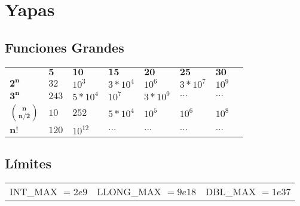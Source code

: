 \documentclass{article}
\begin{document}
\tableofcontents


\pagebreak


\pagebreak


\section{Yapas}

\subsection*{Funciones Grandes}

\begin{tabularx}{0.33\textwidth}{YYYYYYYY}
                      & $\mathbf{5}$ & $\mathbf{10}$ & $\mathbf{15}$ & $\mathbf{20}$ & $\mathbf{25}$ & $\mathbf{30}$ \\
     $\mathbf{2^n}$            & $32$  & $10^3$    & $3*10^4$ & $10^6$   & $3*10^7$ & $10^9$ \\
     $\mathbf{3^n}$            & $243$ & $5*10^4$  & $10^7$   & $3*10^9$ & $...$    & $...$ \\
     $\mathbf{\binom{n}{n/2}}$ & $10$  & $252$     & $5*10^4$ & $10^5$   & $10^6$   & $10^8$ \\
     $\mathbf{n!}$             & $120$ & $10^{12}$ & $...$    & $...$    & $...$    & $...$
\end{tabularx}

\subsection*{Límites}
\begin{tabular}{ccc}
    INT\_MAX $= 2e9$ & LLONG\_MAX $= 9e18$ & DBL\_MAX $= 1e37$
\end{tabular}


\pagebreak


\pagebreak

\pagebreak

\pagebreak

\pagebreak

\pagebreak

\listoftodos[TODOs]
\end{document}
